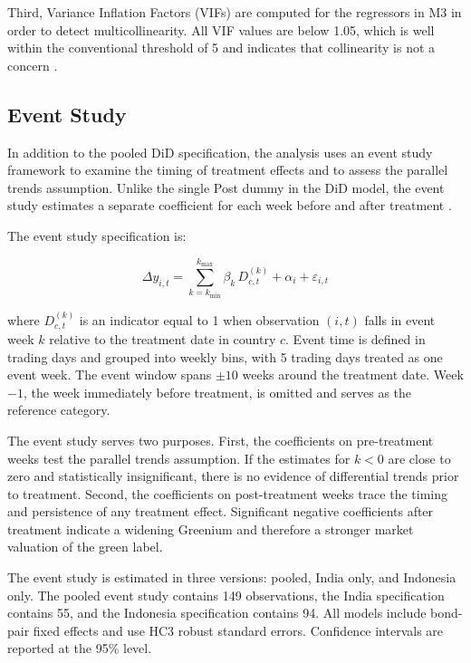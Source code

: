 \documentclass[12pt,a4paper]{article}
\begin{document}
Third, Variance Inflation Factors (VIFs) are computed for the regressors in M3 in order to detect multicollinearity. All VIF values are below 1.05, which is well within the conventional threshold of 5 and indicates that collinearity is not a concern \citep{Chatterjee2012}.

\subsection{Event Study}

In addition to the pooled DiD specification, the analysis uses an event study framework to examine the timing of treatment effects and to assess the parallel trends assumption. Unlike the single Post dummy in the DiD model, the event study estimates a separate coefficient for each week before and after treatment \citep{MacKinlay1997}.

The event study specification is:

\begin{equation}
\Delta y_{i,t} = \sum_{k=k_{\min}}^{k_{\max}} \beta_k \, D^{(k)}_{c,t} + \alpha_i + \varepsilon_{i,t}
\label{eq:event_study}
\end{equation}

\noindent where $D^{(k)}_{c,t}$ is an indicator equal to 1 when observation $(i,t)$ falls in event week $k$ relative to the treatment date in country $c$. Event time is defined in trading days and grouped into weekly bins, with 5 trading days treated as one event week. The event window spans $\pm 10$ weeks around the treatment date. Week $-1$, the week immediately before treatment, is omitted and serves as the reference category.

The event study serves two purposes. First, the coefficients on pre-treatment weeks test the parallel trends assumption. If the estimates for $k < 0$ are close to zero and statistically insignificant, there is no evidence of differential trends prior to treatment. Second, the coefficients on post-treatment weeks trace the timing and persistence of any treatment effect. Significant negative coefficients after treatment indicate a widening Greenium and therefore a stronger market valuation of the green label.

The event study is estimated in three versions: pooled, India only, and Indonesia only. The pooled event study contains 149 observations, the India specification contains 55, and the Indonesia specification contains 94. All models include bond-pair fixed effects and use HC3 robust standard errors. Confidence intervals are reported at the 95\% level.
\end{document}
